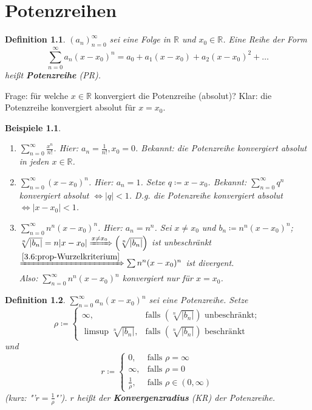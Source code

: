 \documentclass[12pt]{extreport} %
\newcommand{\R}{\mathbb{R}}
\theoremstyle{named}
\theoremstyle{dotless}
\newtheorem*{beispiele}{Beispiele}
\newtheorem*{definition}{Definition}
\begin{document}
\newpage


\chapter{Potenzreihen}

\begin{definition}
	$(a_{n})_{n=0}^{\infty}$ sei eine Folge in $\R$ und $x_{0} \in \R$. Eine Reihe der Form
		$$ \sum_{n=0}^{\infty} a_{n} (x - x_{0})^{n} = a_{0} + a_{1} (x - x_{0}) + a_{2} (x - x_{0})^{2} + \dotsc $$
		hei{\ss}t \textbf{Potenzreihe} (PR). 
\end{definition}

Frage: für welche $x \in \R$ konvergiert die Potenzreihe (absolut)? Klar: die Potenzreihe konvergiert absolut für $x = x_{0}$.

\begin{beispiele} ~\
	\begin{enumerate}
		\item $\sum_{n=0}^{\infty} \frac{x^{n}}{n!}$. Hier: $a_{n} = \frac{1}{n!}, x_{0} = 0$. Bekannt: die Potenzreihe konvergiert absolut in jeden $x \in \R$.
		\item $\sum_{n=0}^{\infty} (x - x_{0})^{n}$. Hier: $a_{n} = 1$. Setze $q \coloneqq x - x_{0}$. Bekannt: $\sum_{n=0}^{\infty} q^{n}$ konvergiert absolut $\iff |q| < 1$. D.g. die Potenzreihe konvergiert absolut $\iff |x - x_{0} | < 1$.
			
		\item $\sum_{n=0}^{\infty} n^{n} (x - x_{0})^{n}$. Hier: $a_{n} = n^{n}$. Sei $x \neq x_{0}$ und $b_{n} \coloneqq n^{n} (x - x_{0})^{n}$; $\sqrt[n]{|b_{n}|} = n |x - x_{0}| \xRightarrow[]{x \neq x_{0}} \left( \sqrt[n]{|b_{n}|} \right)$ ist unbeschränkt $\xRightarrow[]{\ref{3.6:prop-Wurzelkriterium}} \sum n^{n} (x - x_{0})^{n}$ ist divergent. \\
			Also: $\sum_{n=0}^{\infty} n^{n} (x - x_{0})^{n}$ konvergiert nur für $x = x_{0}$.
	\end{enumerate}	
\end{beispiele}

\begin{definition}
	$\sum_{n=0}^{\infty} a_{n} (x - x_{0})^{n}$ sei eine Potenzreihe. Setze
		$$ \rho \coloneqq \begin{cases}
			\infty, & \text{falls } \left( \sqrt[n]{|b_{n}|} \right) \text{ unbeschränkt}; \\
			\limsup \sqrt[n]{|b_{n}|}, & \text{falls } \left( \sqrt[n]{|b_{n}|} \right) \text{ beschränkt}
		\end{cases} $$
	und
		$$ r \coloneqq \begin{cases}
			0, & \text{falls } \rho = \infty \\
			\infty, & \text{falls } \rho = 0 \\
			\frac{1}{\rho}, & \text{falls } \rho \in (0, \infty)
		\end{cases} $$
	(kurz: "'$r = \frac{1}{\rho}$"'). $r$ hei{\ss}t der \textbf{Konvergenzradius} (KR) der Potenzreihe.
\end{definition}
\end{document}
